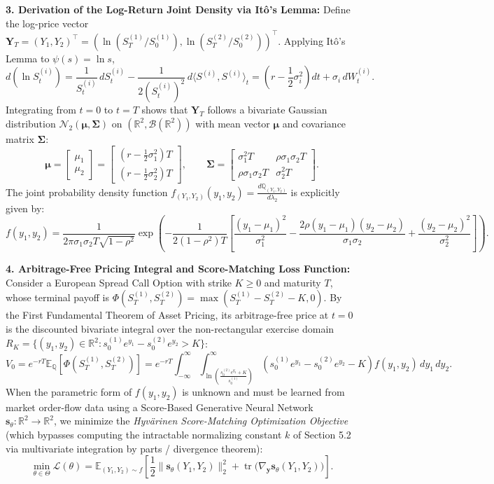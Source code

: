 \documentclass[11pt, letterpaper]{article}
\theoremstyle{definition}
\theoremstyle{remark}
\begin{document}
\textbf{3. Derivation of the Log-Return Joint Density via It\^o's Lemma:}
Define the log-price vector $\mathbf{Y}_T = (Y_1, Y_2)^\top = (\ln(S_T^{(1)}/S_0^{(1)}), \ln(S_T^{(2)}/S_0^{(2)}))^\top$. Applying It\^o's Lemma to $\psi(s) = \ln s$,
\[
    d(\ln S_t^{(i)}) = \frac{1}{S_t^{(i)}}\,dS_t^{(i)} - \frac{1}{2(S_t^{(i)})^2}\,d\langle S^{(i)}, S^{(i)}\rangle_t = \left(r - \frac{1}{2}\sigma_i^2\right)dt + \sigma_i\,dW_t^{(i)}.
\]
Integrating from $t = 0$ to $t = T$ shows that $\mathbf{Y}_T$ follows a bivariate Gaussian distribution $\mathcal{N}_2(\boldsymbol{\mu}, \mathbf{\Sigma})$ on $(\mathbb{R}^2, \mathcal{B}(\mathbb{R}^2))$ with mean vector $\boldsymbol{\mu}$ and covariance matrix $\mathbf{\Sigma}$:
\[
    \boldsymbol{\mu} = \begin{bmatrix} \mu_1 \\ \mu_2 \end{bmatrix} = \begin{bmatrix} \left(r - \frac{1}{2}\sigma_1^2\right)T \\[4pt] \left(r - \frac{1}{2}\sigma_2^2\right)T \end{bmatrix}, \qquad
    \mathbf{\Sigma} = \begin{bmatrix} \sigma_1^2 T & \rho \sigma_1 \sigma_2 T \\[4pt] \rho \sigma_1 \sigma_2 T & \sigma_2^2 T \end{bmatrix}.
\]
The joint probability density function $f_{(Y_1, Y_2)}(y_1, y_2) = \frac{d\mathbb{Q}_{(Y_1, Y_2)}}{d\lambda_2}$ is explicitly given by:
\[
    f(y_1, y_2) = \frac{1}{2\pi \sigma_1 \sigma_2 T \sqrt{1 - \rho^2}} \exp\!\left( -\frac{1}{2(1 - \rho^2)T} \left[ \frac{(y_1 - \mu_1)^2}{\sigma_1^2} - \frac{2\rho(y_1 - \mu_1)(y_2 - \mu_2)}{\sigma_1 \sigma_2} + \frac{(y_2 - \mu_2)^2}{\sigma_2^2} \right] \right).
\]

\textbf{4. Arbitrage-Free Pricing Integral and Score-Matching Loss Function:}
Consider a European Spread Call Option with strike $K \ge 0$ and maturity $T$, whose terminal payoff is $\Phi(S_T^{(1)}, S_T^{(2)}) = \max\!\left(S_T^{(1)} - S_T^{(2)} - K, 0\right)$. By the First Fundamental Theorem of Asset Pricing, its arbitrage-free price at $t = 0$ is the discounted bivariate integral over the non-rectangular exercise domain $R_K = \{(y_1, y_2) \in \mathbb{R}^2 : s_0^{(1)} e^{y_1} - s_0^{(2)} e^{y_2} > K\}$:
\[
    V_0 = e^{-rT} \mathbb{E}_{\mathbb{Q}}\!\left[\Phi(S_T^{(1)}, S_T^{(2)})\right] = e^{-rT} \int_{-\infty}^{\infty} \int_{\ln\!\left(\frac{s_0^{(2)} e^{y_2} + K}{s_0^{(1)}}\right)}^{\infty} \left( s_0^{(1)} e^{y_1} - s_0^{(2)} e^{y_2} - K \right) f(y_1, y_2)\, dy_1\, dy_2.
\]
When the parametric form of $f(y_1, y_2)$ is unknown and must be learned from market order-flow data using a Score-Based Generative Neural Network $\mathbf{s}_\theta : \mathbb{R}^2 \to \mathbb{R}^2$, we minimize the \emph{Hyv\"arinen Score-Matching Optimization Objective} (which bypasses computing the intractable normalizing constant $k$ of Section 5.2 via multivariate integration by parts / divergence theorem):
\[
    \min_{\theta \in \Theta} \mathcal{L}(\theta) = \mathbb{E}_{(Y_1, Y_2) \sim f}\!\left[ \frac{1}{2} \bigl\| \mathbf{s}_\theta(Y_1, Y_2) \bigr\|_2^2 + \operatorname{tr}\!\bigl( \nabla_{\mathbf{y}} \mathbf{s}_\theta(Y_1, Y_2) \bigr) \right].
\]
\end{document}
